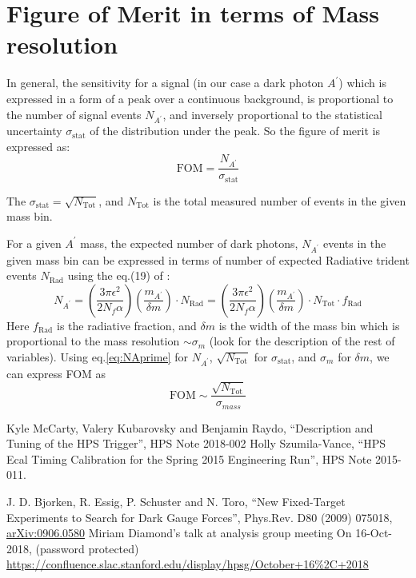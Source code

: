 \documentclass[letterpaper,12pt]{article}
\def \dstl {\displaystyle}
\begin{document}
\appendix
\appendixpage
\addappheadtotoc
\section{Figure of Merit in terms of Mass resolution}
\label{sec:AppendixFOM}
In general, the sensitivity for a signal (in our case a dark photon $A^{\prime}$) which is expressed in a form of a peak over a continuous background, is proportional to the number of signal events $\dstl N_{A^{\prime}}$, and inversely proportional to the statistical uncertainty $\sigma_{\mathrm{stat}}$ of the distribution under the peak.
So the figure of merit is expressed as:
\begin{equation}
 \mathrm{FOM} = \frac{\dstl N_{A^{\prime}}}{\dstl \sigma_{\mathrm{stat}}}
 \label{eq:FOM_massres}
\end{equation}

The $\sigma_{\mathrm{stat}} = \sqrt{N_{\mathrm{Tot}}}$, and $N_{\mathrm{Tot}}$ is the total measured number of events in the given mass bin.

For a given $A^{\prime}$ mass, the expected number of dark photons, 
$\dstl N_{A^{\prime}}$ events in the given mass bin  can be expressed in terms of number of expected Radiative trident events $N_{\mathrm{Rad}}$ using the eq.(19) of \cite{AprimeFixedTargetTheory}:
\begin{equation}
 N_{A^{\prime}} = \left(\frac{\dstl 3\pi \epsilon^{2}}{\dstl 2 N_{f} \alpha}\right) \left( \frac{\dstl m_{A^{\prime}}}{\delta m} \right)\cdot N_{\mathrm{Rad}} = \left(\frac{\dstl 3\pi \epsilon^{2}}{\dstl 2 N_{f} \alpha}\right) \left( \frac{\dstl m_{A^{\prime}}}{\delta m} \right) \cdot N_{\mathrm{Tot}}\cdot f_{\mathrm{Rad}}
 \label{eq:NAprime}
\end{equation}
Here $f_{\mathrm{Rad}}$ is the radiative fraction, and $\delta m$ is the width of the mass bin which is proportional to the mass resolution $\sim \sigma_{m}$ (look \cite{AprimeFixedTargetTheory} for the description of the rest of variables). 
Using eq.\ref{eq:NAprime} for $N_{A^{\prime}}$, $\dstl\sqrt{N_{\mathrm{Tot}}}$ for 
$\sigma_{\mathrm{stat}}$, and $\dstl \sigma_{m}$ for $\delta m$, we can express FOM as
\begin{equation}
 \mathrm {FOM} \sim \frac{\dstl \sqrt{N_{\mathrm{Tot}}}}{\sigma_{mass}}
\end{equation}


\begin{thebibliography}{55}
  Kyle McCarty, Valery Kubarovsky and Benjamin Raydo, ``Description and Tuning of the HPS Trigger'', HPS Note 2018-002
  Holly Szumila-Vance, ``HPS Ecal Timing Calibration for the
Spring 2015 Engineering Run'', HPS Note 2015-011.

 J. D. Bjorken, R. Essig, P. Schuster and N. Toro,
``New Fixed-Target Experiments to Search for Dark Gauge Forces'', Phys.Rev. D80 (2009) 075018, \href{https://arxiv.org/abs/0906.0580}{arXiv:0906.0580}
 Miriam Diamond's talk at analysis group meeting On 16-Oct-2018, (password protected) \href{https://confluence.slac.stanford.edu/display/hpsg/October+16%2C+2018}{https://confluence.slac.stanford.edu/display/hpsg/October+16\%2C+2018}
\end{thebibliography}
\end{document}
